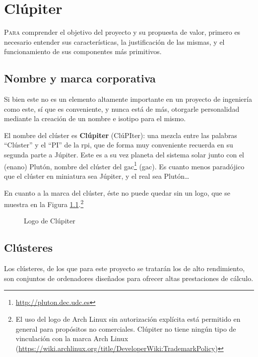 \chapter{Clúpiter}
\label{chap:conceptos_basicos}

\lettrine{P}{ara} comprender el objetivo del proyecto y su propuesta de valor, primero es necesario entender sus características, la justificación de las mismas, y el funcionamiento de sus componentes más primitivos.

\section{Nombre y marca corporativa}
Si bien este no es un elemento altamente importante en un proyecto de ingeniería como este, sí que es conveniente, y nunca está de más, otorgarle personalidad mediante la creación de un nombre e isotipo para el mismo.

El nombre del clúster es \textbf{Clúpiter} (ClúPIter): una mezcla entre las palabras ``Clúster'' y el ``PI'' de la \acrlong{rpi}, que de forma muy conveniente recuerda en su segunda parte a Júpiter. Este es a su vez planeta del sistema solar junto con el (enano) Plutón, nombre del clúster del \acrshort{gac}\footnote{\url{http://pluton.dec.udc.es}} (\acrlong{gac}). Es cuanto menos paradójico que el clúster en miniatura sea Júpiter, y el real sea Plutón\dots

En cuanto a la marca del clúster, éste no puede quedar sin un logo, que se muestra en la Figura \ref{fig:clupiter_logo}.\footnote{El uso del logo de Arch Linux sin autorización explícita está permitido en general para propósitos no comerciales. Clúpiter no tiene ningún tipo de vinculación con la marca Arch Linux (\url{https://wiki.archlinux.org/title/DeveloperWiki:TrademarkPolicy})}

\begin{figure}[h!]
  \centering
  \vspace*{0.5cm}
  \def\svgwidth{0.50\textwidth}
  
  \caption{Logo de Clúpiter}
  \label{fig:clupiter_logo}
\end{figure}

\section{Clústeres}
Los clústeres, de los que para este proyecto se tratarán los de alto rendimiento, son conjuntos de ordenadores diseñados para ofrecer altas prestaciones de cálculo.

